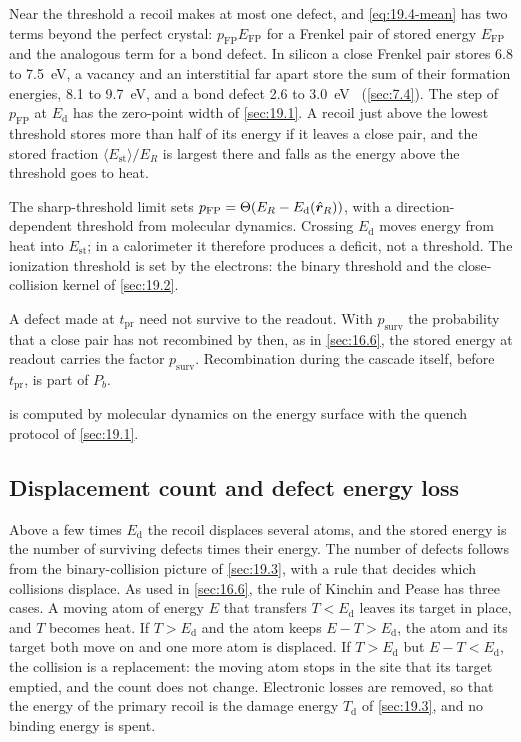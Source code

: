 Near the threshold a recoil makes at most one defect, and \cref{eq:19.4-mean} has two terms beyond the perfect crystal: $p_{\mathrm{FP}}E_{\mathrm{FP}}$ for a Frenkel pair of stored energy $E_{\mathrm{FP}}$ and the analogous term for a bond defect. In silicon a close Frenkel pair stores 6.8 to \SI{7.5}{eV}, a vacancy and an interstitial far apart store the sum of their formation energies, 8.1 to \SI{9.7}{eV}, and a bond defect 2.6 to \SI{3.0}{eV}~\cite[Table~III]{holmstrom2008threshold} (\cref{sec:7.4}). The step of $p_{\mathrm{FP}}$ at $E_{\mathrm{d}}$ has the zero-point width of \cref{sec:19.1}. A recoil just above the lowest threshold stores more than half of its energy if it leaves a close pair, and the stored fraction $\langle E_{\mathrm{st}}\rangle/E_R$ is largest there and falls as the energy above the threshold goes to heat.

The sharp-threshold limit sets $p_{\mathrm{FP}} = \Theta(E_R - E_{\mathrm{d}}(\hat{\bm{r}}_R))$, with a direction-dependent threshold from molecular dynamics. Crossing $E_{\mathrm{d}}$ moves energy from heat into $E_{\mathrm{st}}$; in a calorimeter it therefore produces a deficit, not a threshold. The ionization threshold is set by the electrons: the binary threshold and the close-collision kernel of \cref{sec:19.2}.

A defect made at $t_{\mathrm{pr}}$ need not survive to the readout. With $p_{\mathrm{surv}}$ the probability that a close pair has not recombined by then, as in \cref{sec:16.6}, the stored energy at readout carries the factor $p_{\mathrm{surv}}$. Recombination during the cascade itself, before $t_{\mathrm{pr}}$, is part of $P_b$.

 is computed by molecular dynamics on the energy surface with the quench protocol of \cref{sec:19.1}.

\subsection{Displacement count and defect energy loss}\label{sec:19.4-count}

Above a few times $E_{\mathrm{d}}$ the recoil displaces several atoms, and the stored energy is the number of surviving defects times their energy. The number of defects follows from the binary-collision picture of \cref{sec:19.3}, with a rule that decides which collisions displace. As used in \cref{sec:16.6}, the rule of Kinchin and Pease has three cases. A moving atom of energy $E$ that transfers $T < E_{\mathrm{d}}$ leaves its target in place, and $T$ becomes heat. If $T > E_{\mathrm{d}}$ and the atom keeps $E - T > E_{\mathrm{d}}$, the atom and its target both move on and one more atom is displaced. If $T > E_{\mathrm{d}}$ but $E - T < E_{\mathrm{d}}$, the collision is a replacement: the moving atom stops in the site that its target emptied, and the count does not change. Electronic losses are removed, so that the energy of the primary recoil is the damage energy $T_{\mathrm{d}}$ of \cref{sec:19.3}, and no binding energy is spent.


